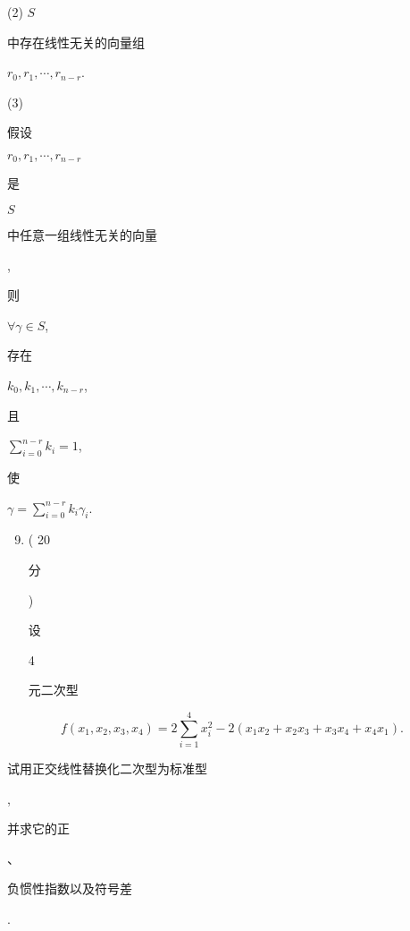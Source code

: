 \documentclass[10pt]{article}
\begin{document}
(2) $S$ \begin{CJK}{UTF8}{mj}中存在线性无关的向量组\end{CJK} $r_{0}, r_{1}, \cdots, r_{n-r}$.

(3) \begin{CJK}{UTF8}{mj}假设\end{CJK} $r_{0}, r_{1}, \cdots, r_{n-r}$ \begin{CJK}{UTF8}{mj}是\end{CJK} $S$ \begin{CJK}{UTF8}{mj}中任意一组线性无关的向量\end{CJK}, \begin{CJK}{UTF8}{mj}则\end{CJK} $\forall \gamma \in S$, \begin{CJK}{UTF8}{mj}存在\end{CJK} $k_{0}, k_{1}, \cdots, k_{n-r}$, \begin{CJK}{UTF8}{mj}且\end{CJK} $\sum_{i=0}^{n-r} k_{i}=1$, \begin{CJK}{UTF8}{mj}使\end{CJK} $\gamma=\sum_{i=0}^{n-r} k_{i} \gamma_{i}$.

\begin{enumerate}
  \setcounter{enumi}{8}
  \item ( 20 \begin{CJK}{UTF8}{mj}分\end{CJK}) \begin{CJK}{UTF8}{mj}设\end{CJK} 4 \begin{CJK}{UTF8}{mj}元二次型\end{CJK}
\end{enumerate}
$$
f\left(x_{1}, x_{2}, x_{3}, x_{4}\right)=2 \sum_{i=1}^{4} x_{i}^{2}-2\left(x_{1} x_{2}+x_{2} x_{3}+x_{3} x_{4}+x_{4} x_{1}\right) .
$$
\begin{CJK}{UTF8}{mj}试用正交线性替换化二次型为标准型\end{CJK}, \begin{CJK}{UTF8}{mj}并求它的正\end{CJK}、\begin{CJK}{UTF8}{mj}负惯性指数以及符号差\end{CJK}.
\end{document}
